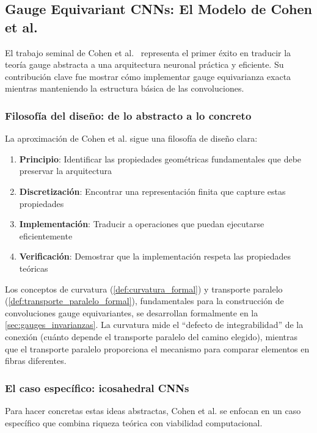 \subsection{Gauge Equivariant CNNs: El Modelo de Cohen et al.}\label{subsec:modelo_cohen_gauge}

El trabajo seminal de Cohen et al.~\citep{cohen2019gaugeequivariantconvolutional} representa el primer éxito en traducir la teoría gauge abstracta a una arquitectura neuronal práctica y eficiente. Su contribución clave fue mostrar cómo implementar gauge equivarianza exacta mientras manteniendo la estructura básica de las convoluciones.

\subsubsection{Filosofía del diseño: de lo abstracto a lo concreto}

La aproximación de Cohen et al. sigue una filosofía de diseño clara:
\begin{enumerate}
    \item \textbf{Principio}: Identificar las propiedades geométricas fundamentales que debe preservar la arquitectura
    \item \textbf{Discretización}: Encontrar una representación finita que capture estas propiedades  
    \item \textbf{Implementación}: Traducir a operaciones que puedan ejecutarse eficientemente
    \item \textbf{Verificación}: Demostrar que la implementación respeta las propiedades teóricas
\end{enumerate}

Los conceptos de curvatura (\autoref{def:curvatura_formal}) y transporte paralelo (\autoref{def:transporte_paralelo_formal}), fundamentales para la construcción de convoluciones gauge equivariantes, se desarrollan formalmente en la \autoref{sec:gauges_invarianzas}. La curvatura mide el ``defecto de integrabilidad'' de la conexión (cuánto depende el transporte paralelo del camino elegido), mientras que el transporte paralelo proporciona el mecanismo para comparar elementos en fibras diferentes.

\subsubsection{El caso específico: icosahedral CNNs}

Para hacer concretas estas ideas abstractas, Cohen et al. se enfocan en un caso específico que combina riqueza teórica con viabilidad computacional.

